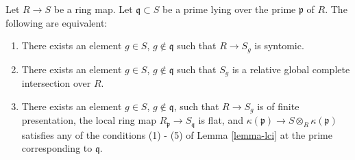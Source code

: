 \begin{lemma}
\label{lemma-syntomic}
Let $R \to S$ be a ring map.
Let $\mathfrak q \subset S$ be a prime lying over
the prime $\mathfrak p$ of $R$.
The following are equivalent:
\begin{enumerate}
\item There exists an element $g \in S$, $g \not \in \mathfrak q$ such that
$R \to S_g$ is syntomic.
\item There exists an element $g \in S$, $g \not \in \mathfrak q$
such that $S_g$ is a relative global complete intersection over $R$.
\item There exists an element $g \in S$, $g \not \in \mathfrak q$,
such that $R \to S_g$ is of finite presentation,
the local ring map $R_{\mathfrak p} \to S_{\mathfrak q}$ is flat, and
$\kappa(\mathfrak p) \to S \otimes_R \kappa(\mathfrak p)$
satisfies any of the conditions (1) - (5) of Lemma \ref{lemma-lci}
at the prime corresponding to $\mathfrak q$.
\end{enumerate}
\end{lemma}


